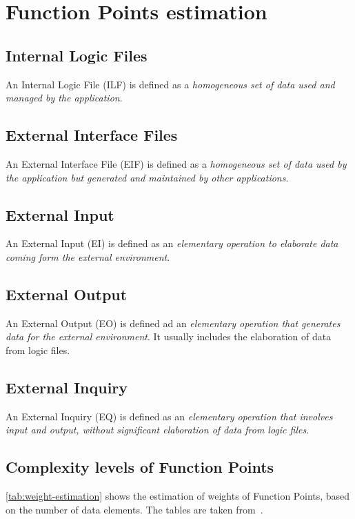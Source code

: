 \chapter{Function Points estimation}
\label{chap:function-points}

\section{Internal Logic Files}
An Internal Logic File (ILF) is defined as a \emph{homogeneous set of data used
and managed by the application}.

\section{External Interface Files}
An External Interface File (EIF) is defined as a \emph{homogeneous set of data used by the application but generated and maintained by other applications}.

\section{External Input}
An External Input (EI) is defined as an \emph{elementary operation to elaborate data coming form the external environment}.

\section{External Output}
An External Output (EO) is defined ad an \emph{elementary operation that generates data for the external environment}. It usually includes the elaboration of data from logic files.

\section{External Inquiry}
An External Inquiry (EQ) is defined as an \emph{elementary operation that involves input and output, without significant elaboration of data from logic files}.

\section{Complexity levels of Function Points}
\autoref{tab:weight-estimation} shows the estimation of weights of Function Points, based on the number of data elements. The tables are taken from~\cite{cocomo-manual}.

